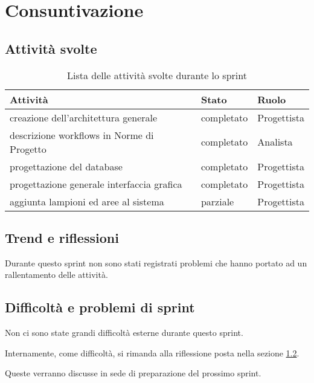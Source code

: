 \section{Consuntivazione}

\subsection{Attività svolte}

\begin{table}[H]
    \begin{xltabular}{\textwidth}{X l l}

         \textbf{Attività} & \textbf{Stato} & \textbf{Ruolo}\\
        \endhead
        \hline
        creazione dell'architettura generale & completato & Progettista \\
        descrizione workflows in Norme di Progetto & completato & Analista \\
        progettazione del database & completato &Progettista \\
        progettazione generale interfaccia grafica & completato & Progettista \\
        aggiunta lampioni ed aree al sistema & parziale & Progettista
    \end{xltabular}
    \caption{Lista delle attività svolte durante lo sprint}
\end{table}

\subsection{Trend e riflessioni}\label{subsec:trend}

Durante questo sprint non sono stati registrati problemi che hanno portato ad un rallentamento delle attività.

\subsection{Difficoltà e problemi di sprint}

Non ci sono state grandi difficoltà esterne durante questo sprint.

Internamente, come difficoltà, si rimanda alla riflessione posta nella sezione \ref{subsec:trend}.

Queste verranno discusse in sede di preparazione del prossimo sprint.
